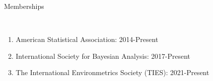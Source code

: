\documentclass[12pt]{article}
\newcommand{\head}[1]{ %
    \bigskip %
    \begin{large}\begin{bf}{#1}\end{bf}\end{large} %

    \ \\ [-1.3cm] %

    \hrulefill}
\begin{document}
\head{Memberships}

\begin{enumerate}[label=$\bullet$]
\item American Statistical Association: 2014-Present
\item International Society for Bayesian Analysis: 2017-Present
\item The International Environmetrics Society (TIES): 2021-Present
\end{enumerate}



\end{document}
